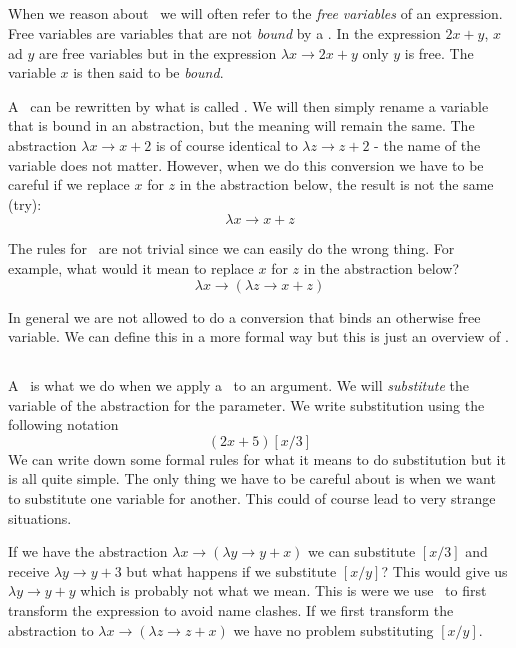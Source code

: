 \documentclass[a4paper,11pt]{article}
\begin{document}
\subsection{\alphac}

When we reason about \lamc\ we will often refer to the {\em free
  variables} of an expression. Free variables are variables that are
not {\em bound} by a \lama. In the expression $2x + y$, $x$ ad $y$ are
free variables but in the expression $\lambda x \rightarrow 2x + y$
only $y$ is free. The variable $x$ is then said to be {\em bound}.

A \lama\ can be rewritten by what is called {\em \alphac}. We will then
simply rename a variable that is bound in an abstraction, but the
meaning will remain the same. The abstraction
$\lambda x \rightarrow x +2$ is of course identical to
$\lambda z \rightarrow z +2$ - the name of the variable does not
matter. However, when we do this conversion we have to be careful if
we replace $x$ for $z$ in the abstraction below, the result is not the
same (try):$$\lambda x \rightarrow x + z$$

The rules for \alphac\ are not trivial since we can easily do the
wrong thing. For example, what would it mean to replace $x$ for $z$ in
the abstraction below? $$\lambda x \rightarrow (\lambda z \rightarrow x + z)$$

In general we are not allowed to do a conversion that binds an
otherwise free variable. We can define this in a more formal way but
this is just an overview of \lamc.

\subsection{\betar}

A \betar\ is what we do when we apply a \lama\ to an argument. We will
{\em substitute} the variable of the abstraction for the parameter. We
write substitution using the following notation $$(2x + 5)[x/3]$$ We
can write down some formal rules for what it means to do substitution
but it is all quite simple. The only thing we have to be careful
about is when we want to substitute one variable for another. This
could of course lead to very strange situations. 

If we have the abstraction
$\lambda x \rightarrow (\lambda y \rightarrow y + x)$ we can
substitute $[x/3]$ and receive $\lambda y \rightarrow y + 3$ but what
happens if we substitute $[x/y]$? This would give us
$\lambda y \rightarrow y + y$ which is probably not what we mean. This
is were we use \alphac\ to first transform the expression to avoid
name clashes. If we first transform the abstraction to
$\lambda x \rightarrow (\lambda z \rightarrow z + x)$ we have no
problem substituting $[x/y]$.
\end{document}
